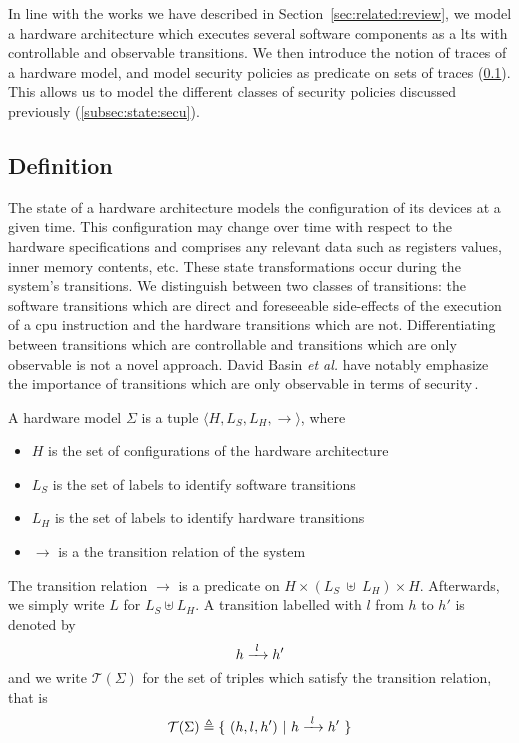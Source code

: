In line with the works we have described in Section~\ref{sec:related:review}, we
model a hardware architecture which executes several software components as a
\ac{lts} with controllable and observable transitions.
%
We then introduce the notion of traces of a hardware model, and model security
policies as predicate on sets of traces
(\ref{subsec:speccert:def}).
%
This allows us to model the different classes of security policies discussed
previously (\ref{subsec:state:secu}).

\subsection{Definition}
\label{subsec:speccert:def}

The state of a hardware architecture models the configuration of its devices at
a given time.
%
This configuration may change over time with respect to the hardware
specifications and comprises any relevant data such as registers values, inner
memory contents, etc.
%
These state transformations occur during the system's transitions.
%
We distinguish between two classes of transitions: the software transitions
which are direct and foreseeable side-effects of the execution of a \ac{cpu}
instruction and the hardware transitions which are not.
%
Differentiating between transitions which are controllable and transitions which
are only observable is not a novel approach.
%
David Basin \emph{et al.} have notably emphasize the importance of transitions
which are only observable in terms of security\,\cite{basin2013enforceable}.

\begin{definition}
  \label{def:speccert:model}
  A hardware model $\Sigma$ is a tuple
  $\langle H, L_S, L_H, \rightarrow \rangle$, where
  \begin{itemize}
  \item $H$ is the set of configurations of the hardware architecture
  \item $L_S$ is the set of labels to identify software transitions
  \item $L_H$ is the set of labels to identify hardware transitions
  \item $\rightarrow$ is a the transition relation of the system
  \end{itemize}

  The transition relation $\rightarrow$ is a predicate on
  $H \times (L_S~\uplus~L_H) \times H$.
  Afterwards, we simply write $L$ for $L_S \uplus L_H$.
  A transition labelled with $l$ from $h$ to $h'$ is denoted by
  \[
    h \xrightarrow{\hskip0.3em\relax l\hskip0.3em\relax} h'
  \]
  and we write $\mathcal{T}(\Sigma)$ for the set of triples which satisfy the
  transition relation, that is
  \[
    \mathcal{T}(\Sigma) \triangleq \{\ (h, l, h')\ |\ h \xrightarrow{\hskip0.3em\relax l\hskip0.3em\relax} h'\ \}
  \]
\end{definition}


